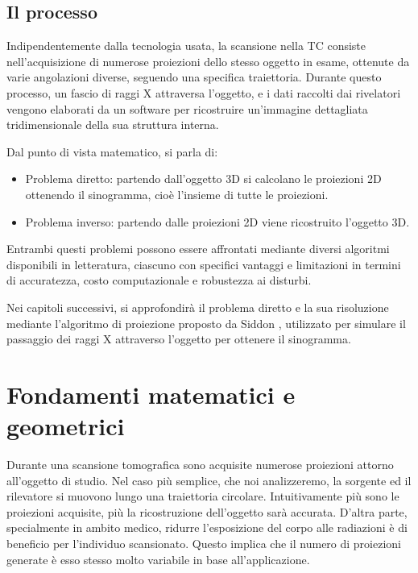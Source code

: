 \documentclass[12pt,a4paper]{report}
\begin{document}
\section{Il processo}

Indipendentemente dalla tecnologia usata, la scansione nella TC consiste nell'acquisizione di numerose proiezioni dello stesso
oggetto in esame, ottenute da varie angolazioni diverse, seguendo una specifica traiettoria.
Durante questo processo, un fascio di raggi X attraversa l'oggetto, e i dati raccolti dai rivelatori vengono elaborati da un
software per ricostruire un'immagine dettagliata tridimensionale della sua struttura interna.

Dal punto di vista matematico, si parla di:
\begin{itemize}
  \item Problema diretto: partendo dall'oggetto 3D si calcolano le proiezioni 2D ottenendo il sinogramma, cioè l'insieme di tutte
        le proiezioni.
  \item Problema inverso: partendo dalle proiezioni 2D viene ricostruito l'oggetto 3D.
\end{itemize}

Entrambi questi problemi possono essere affrontati mediante diversi algoritmi disponibili in letteratura, ciascuno con specifici
vantaggi e limitazioni in termini di accuratezza, costo computazionale e robustezza ai disturbi.

Nei capitoli successivi, si approfondirà il problema diretto e la sua risoluzione mediante l'algoritmo di proiezione proposto da
Siddon \cite{Siddon1984}, utilizzato per simulare il passaggio dei raggi X attraverso l'oggetto per ottenere il sinogramma.

\chapter{Fondamenti matematici e geometrici} \label{chap:math}

Durante una scansione tomografica sono acquisite numerose proiezioni attorno all'oggetto di studio.
Nel caso più semplice, che noi analizzeremo, la sorgente ed il rilevatore si muovono lungo una traiettoria circolare.
Intuitivamente più sono le proiezioni acquisite, più la ricostruzione dell'oggetto sarà accurata.
D'altra parte, specialmente in ambito medico, ridurre l'esposizione del corpo alle radiazioni è di beneficio per l'individuo
scansionato.
Questo implica che il numero di proiezioni generate è esso stesso molto variabile in base all'applicazione.
\end{document}
